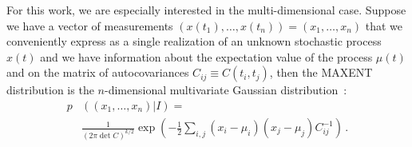 \documentclass[epj,nopacs]{svjour}
\begin{document}
For this work, we are especially interested in the multi-dimensional case. Suppose we have a vector of measurements $(x(t_1),\ldots,x(t_n)) = (x_1, \ldots, x_n)$ that we conveniently express as a single realization of an unknown stochastic process $x(t)$ and we have information about the expectation value of the process $\mu(t)$ and on the matrix of autocovariances $C_{ij} \equiv C(t_i,t_j)$, then the MAXENT distribution is the $n$-dimensional multivariate Gaussian distribution~\cite{gregory_2005}: 
\begin{align}
    p&\left((x_1, \ldots, x_n)\vert I\right) = \nonumber \\
    &\frac{1}{\left(2 \pi \det C\right)^{k / 2}}\exp\left(-\frac{1}{2}\sum_{i,j}(x_i-\mu_i) (x_j-\mu_j)C^{-1}_{ij} \right)\,. 
\end{align}
\end{document}
